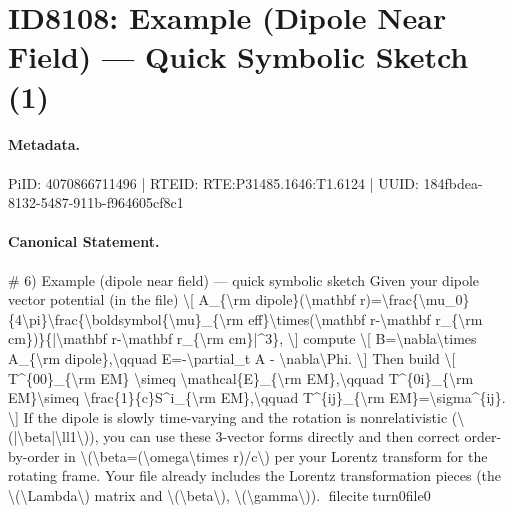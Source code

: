 \section*{ID8108: Example (Dipole Near Field) — Quick Symbolic Sketch (1)}
\paragraph{Metadata.}
PiID: 4070866711496 | RTEID: RTE:P31485.1646:T1.6124 | UUID: 184fbdea-8132-5487-911b-f964605cf8c1

\paragraph{Canonical Statement.}
\# 6) Example (dipole near field) — quick symbolic sketch Given your dipole vector potential (in the file) \textbackslash{}[ A\_\{\textbackslash{}rm dipole\}(\textbackslash{}mathbf r)=\textbackslash{}frac\{\textbackslash{}mu\_0\}\{4\textbackslash{}pi\}\textbackslash{}frac\{\textbackslash{}boldsymbol\{\textbackslash{}mu\}\_\{\textbackslash{}rm eff\}\textbackslash{}times(\textbackslash{}mathbf r-\textbackslash{}mathbf r\_\{\textbackslash{}rm cm\})\}\{|\textbackslash{}mathbf r-\textbackslash{}mathbf r\_\{\textbackslash{}rm cm\}|\textasciicircum{}3\}, \textbackslash{}] compute \textbackslash{}[ B=\textbackslash{}nabla\textbackslash{}times A\_\{\textbackslash{}rm dipole\},\textbackslash{}qquad E=-\textbackslash{}partial\_t A - \textbackslash{}nabla\textbackslash{}Phi. \textbackslash{}] Then build \textbackslash{}[ T\textasciicircum{}\{00\}\_\{\textbackslash{}rm EM\} \textbackslash{}simeq \textbackslash{}mathcal\{E\}\_\{\textbackslash{}rm EM\},\textbackslash{}qquad T\textasciicircum{}\{0i\}\_\{\textbackslash{}rm EM\}\textbackslash{}simeq \textbackslash{}frac\{1\}\{c\}S\textasciicircum{}i\_\{\textbackslash{}rm EM\},\textbackslash{}qquad T\textasciicircum{}\{ij\}\_\{\textbackslash{}rm EM\}=\textbackslash{}sigma\textasciicircum{}\{ij\}. \textbackslash{}] If the dipole is slowly time-varying and the rotation is nonrelativistic (\textbackslash{}(|\textbackslash{}beta|\textbackslash{}ll1\textbackslash{})), you can use these 3-vector forms directly and then correct order-by-order in \textbackslash{}(\textbackslash{}beta=(\textbackslash{}omega\textbackslash{}times r)/c\textbackslash{}) per your Lorentz transform for the rotating frame. Your file already includes the Lorentz transformation pieces (the \textbackslash{}(\textbackslash{}Lambda\textbackslash{}) matrix and \textbackslash{}(\textbackslash{}beta\textbackslash{}), \textbackslash{}(\textbackslash{}gamma\textbackslash{})). fileciteturn0file0

